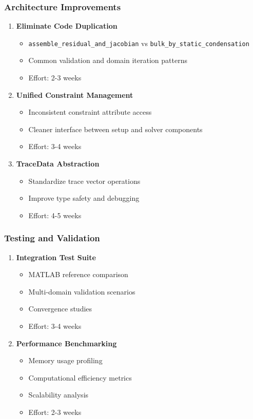 \subsubsection{Architecture Improvements}
\begin{enumerate}
    \item \textbf{Eliminate Code Duplication}
    \begin{itemize}
        \item \texttt{assemble\_residual\_and\_jacobian} vs \texttt{bulk\_by\_static\_condensation}
        \item Common validation and domain iteration patterns
        \item Effort: 2-3 weeks
    \end{itemize}
    
    \item \textbf{Unified Constraint Management}
    \begin{itemize}
        \item Inconsistent constraint attribute access
        \item Cleaner interface between setup and solver components
        \item Effort: 3-4 weeks
    \end{itemize}
    
    \item \textbf{TraceData Abstraction}
    \begin{itemize}
        \item Standardize trace vector operations
        \item Improve type safety and debugging
        \item Effort: 4-5 weeks
    \end{itemize}
\end{enumerate}

\subsubsection{Testing and Validation}
\begin{enumerate}
    \item \textbf{Integration Test Suite}
    \begin{itemize}
        \item MATLAB reference comparison
        \item Multi-domain validation scenarios
        \item Convergence studies
        \item Effort: 3-4 weeks
    \end{itemize}
    
    \item \textbf{Performance Benchmarking}
    \begin{itemize}
        \item Memory usage profiling
        \item Computational efficiency metrics
        \item Scalability analysis
        \item Effort: 2-3 weeks
    \end{itemize}
\end{enumerate}

